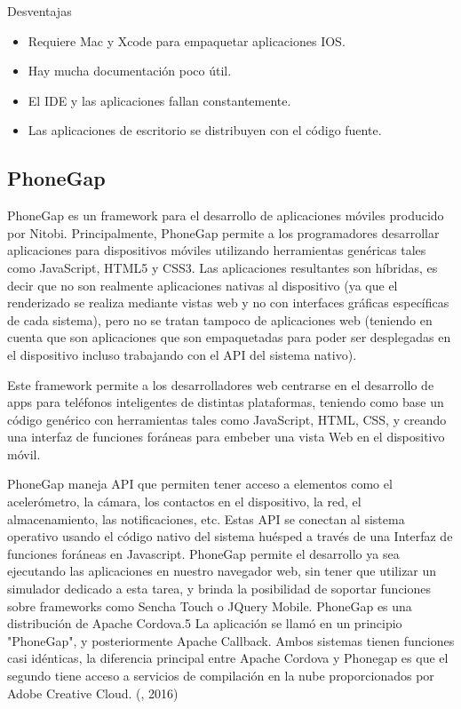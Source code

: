 Desventajas

\begin{itemize}

    \item Requiere Mac y Xcode para empaquetar aplicaciones IOS.
    
    \item Hay mucha documentación poco útil.
    
    \item El IDE y las aplicaciones fallan constantemente.
    
    \item Las aplicaciones de escritorio se distribuyen con el código fuente.

\end{itemize}

\subsection{PhoneGap}
\setlength{\parskip}{5mm}
PhoneGap es un framework para el desarrollo de aplicaciones móviles producido por Nitobi. Principalmente, PhoneGap permite a los programadores desarrollar aplicaciones para dispositivos móviles utilizando herramientas genéricas tales como JavaScript, HTML5 y CSS3. Las aplicaciones resultantes son híbridas, es decir que no son realmente aplicaciones nativas al dispositivo (ya que el renderizado se realiza mediante vistas web y no con interfaces gráficas específicas de cada sistema), pero no se tratan tampoco de aplicaciones web (teniendo en cuenta que son aplicaciones que son empaquetadas para poder ser desplegadas en el dispositivo incluso trabajando con el API del sistema nativo).

Este framework permite a los desarrolladores web centrarse en el desarrollo de apps para teléfonos inteligentes de distintas plataformas, teniendo como base un código genérico con herramientas tales como JavaScript, HTML, CSS, y creando una interfaz de funciones foráneas para embeber una vista Web en el dispositivo móvil.

PhoneGap maneja API que permiten tener acceso a elementos como el acelerómetro, la cámara, los contactos en el dispositivo, la red, el almacenamiento, las notificaciones, etc. Estas API se conectan al sistema operativo usando el código nativo del sistema huésped a través de una Interfaz de funciones foráneas en Javascript.
PhoneGap permite el desarrollo ya sea ejecutando las aplicaciones en nuestro navegador web, sin tener que utilizar un simulador dedicado a esta tarea, y brinda la posibilidad de soportar funciones sobre frameworks como Sencha Touch o JQuery Mobile.
PhoneGap es una distribución de Apache Cordova.5 La aplicación se llamó en un principio "PhoneGap", y posteriormente Apache Callback. Ambos sistemas tienen funciones casi idénticas, la diferencia principal entre Apache Cordova y Phonegap es que el segundo tiene acceso a servicios de compilación en la nube proporcionados por Adobe Creative Cloud. (\citet{phonegapbib}, 2016)

